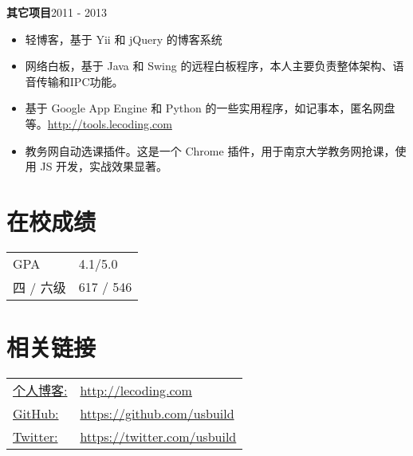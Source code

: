 \documentclass[margin]{res}
\begin{document}
\begin{resume}
{\bf 其它项目}\hfill 2011 - 2013
\begin{itemize} \itemsep -2pt
\item 轻博客，基于 Yii 和 jQuery 的博客系统
\item 网络白板，基于 Java 和 Swing 的远程白板程序，本人主要负责整体架构、语音传输和IPC功能。
\item 基于 Google App Engine 和 Python 的一些实用程序，如记事本，匿名网盘等。\href{http://tools.lecoding.com}{http://tools.lecoding.com}
\item 教务网自动选课插件。这是一个 Chrome 插件，用于南京大学教务网抢课，使用 JS 开发，实战效果显著。
\end{itemize}

\section{在校成绩} 
   \begin{tabular}{l p{3in}}
      GPA &  4.1/5.0 \\
      四 / 六级 & 617 / 546
 \end{tabular}

\section{相关链接}
   \begin{tabular}{l p{3in}}
     \underline{个人博客:} & \href{http://lecoding.com}{http://lecoding.com}\\
     \underline{GitHub:} &  \href{https://github.com/usbuild}{https://github.com/usbuild}\\
     \underline{Twitter:} & \href{https://twitter.com/usbuild}{https://twitter.com/usbuild}
 \end{tabular}

\end{resume} 
\end{document}
